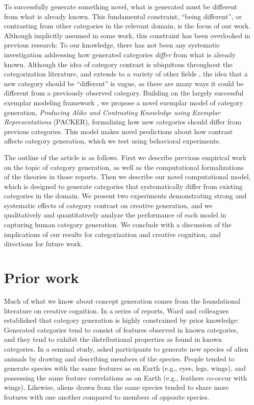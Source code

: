\documentclass[12pt]{article}
\begin{document}
\begin{flushleft}
To successfully generate something novel, what is generated must be different from what is already known. This fundamental constraint, ``being different'', or contrasting from other categories in the relevant domain, is the focus of our work. Although implicitly assumed in some work, this constraint has been overlooked in previous research: To our knowledge, there has not been any systematic investigation addressing how generated categories {\em differ} from what is already known. Although the idea of category contrast is ubiquitous throughout the categorization literature, and extends to a variety of other fields \citep[e.g., color;][]{regier2007}, the idea that a new category should be ``different'' is vague, as there are many ways it could be different from a previously observed category. Building on the largely successful exemplar modeling framework \citep{medin1978context,nosofsky1984choice,nosofsky1986attention}, we propose a novel exemplar model of category generation, {\em Producing Alike and Contrasting Knowledge using Exemplar Representations} (PACKER), formalizing how new categories should differ from previous categories. This model makes novel predictions about how contrast affects category generation, which we test using behavioral experiments.

The outline of the article is as follows. First we describe previous empirical work on the topic of category generation, as well as the computational formalizations of the theories in those reports. Then we describe our novel computational model, which is designed to generate categories that systematically differ from existing categories in the domain. We present two experiments demonstrating strong and systematic effects of category contrast on creative generation, and we qualitatively and quantitatively analyze the performance of each model in capturing human category generation. We conclude with a discussion of the implications of our results for categorization and creative cognition, and directions for future work.

\section{Prior work}

Much of what we know about concept generation comes from the foundational literature on creative cognition. In a series of reports, Ward and colleagues \citep{ward1995s,ward1994structured,marsh1999inadvertent,ward2002role,smith1993constraining} established that category generation is highly constrained by prior knowledge: Generated categories tend to consist of features observed in known categories, and they tend to exhibit the distributional properties as found in known categories. In a seminal study, \cite{ward1994structured} asked participants to generate new species of alien animals by drawing and describing members of the species. People tended to generate species with the same features as on Earth (e.g., eyes, legs, wings), and possessing the same feature correlations as on Earth (e.g., feathers co-occur with wings). Likewise, aliens drawn from the same species tended to share more features with one another compared to members of opposite species. 


\end{flushleft}
\end{document}
